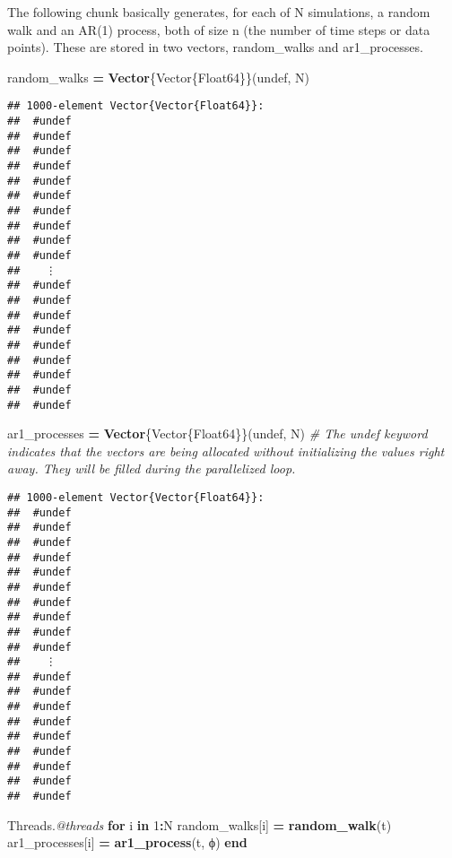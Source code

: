 \documentclass[
]{article}
\newenvironment{Shaded}{\begin{snugshade}}{\end{snugshade}}
\newcommand{\BuiltInTok}[1]{#1}
\newcommand{\CommentTok}[1]{\textcolor[rgb]{0.56,0.35,0.01}{\textit{#1}}}
\newcommand{\ConstantTok}[1]{\textcolor[rgb]{0.56,0.35,0.01}{#1}}
\newcommand{\ControlFlowTok}[1]{\textcolor[rgb]{0.13,0.29,0.53}{\textbf{#1}}}
\newcommand{\DataTypeTok}[1]{\textcolor[rgb]{0.13,0.29,0.53}{#1}}
\newcommand{\FloatTok}[1]{\textcolor[rgb]{0.00,0.00,0.81}{#1}}
\newcommand{\FunctionTok}[1]{\textcolor[rgb]{0.13,0.29,0.53}{\textbf{#1}}}
\newcommand{\KeywordTok}[1]{\textcolor[rgb]{0.13,0.29,0.53}{\textbf{#1}}}
\newcommand{\NormalTok}[1]{#1}
\newcommand{\OperatorTok}[1]{\textcolor[rgb]{0.81,0.36,0.00}{\textbf{#1}}}
\newcommand{\PreprocessorTok}[1]{\textcolor[rgb]{0.56,0.35,0.01}{\textit{#1}}}
\begin{document}
The following chunk basically generates, for each of N simulations, a
random walk and an AR(1) process, both of size n (the number of time
steps or data points). These are stored in two vectors, random\_walks
and ar1\_processes.

\begin{Shaded}
\begin{Highlighting}[]
\NormalTok{random\_walks }\OperatorTok{=} \FunctionTok{Vector}\DataTypeTok{\{Vector\{Float64\}\}}\NormalTok{(}\ConstantTok{undef}\NormalTok{, N)}
\end{Highlighting}
\end{Shaded}

\begin{verbatim}
## 1000-element Vector{Vector{Float64}}:
##  #undef
##  #undef
##  #undef
##  #undef
##  #undef
##  #undef
##  #undef
##  #undef
##  #undef
##  #undef
##    ⋮
##  #undef
##  #undef
##  #undef
##  #undef
##  #undef
##  #undef
##  #undef
##  #undef
##  #undef
\end{verbatim}

\begin{Shaded}
\begin{Highlighting}[]
\NormalTok{ar1\_processes }\OperatorTok{=} \FunctionTok{Vector}\DataTypeTok{\{Vector\{Float64\}\}}\NormalTok{(}\ConstantTok{undef}\NormalTok{, N) }\CommentTok{\# The undef keyword indicates that the vectors are being allocated without initializing the values right away. They will be filled during the parallelized loop.}
\end{Highlighting}
\end{Shaded}

\begin{verbatim}
## 1000-element Vector{Vector{Float64}}:
##  #undef
##  #undef
##  #undef
##  #undef
##  #undef
##  #undef
##  #undef
##  #undef
##  #undef
##  #undef
##    ⋮
##  #undef
##  #undef
##  #undef
##  #undef
##  #undef
##  #undef
##  #undef
##  #undef
##  #undef
\end{verbatim}

\begin{Shaded}
\begin{Highlighting}[]

\BuiltInTok{Threads}\NormalTok{.}\PreprocessorTok{@threads} \ControlFlowTok{for}\NormalTok{ i }\KeywordTok{in} \FloatTok{1}\OperatorTok{:}\NormalTok{N}
\NormalTok{    random\_walks[i] }\OperatorTok{=} \FunctionTok{random\_walk}\NormalTok{(t)}
\NormalTok{    ar1\_processes[i] }\OperatorTok{=} \FunctionTok{ar1\_process}\NormalTok{(t, ϕ)}
\ControlFlowTok{end}
\end{Highlighting}
\end{Shaded}
\end{document}
